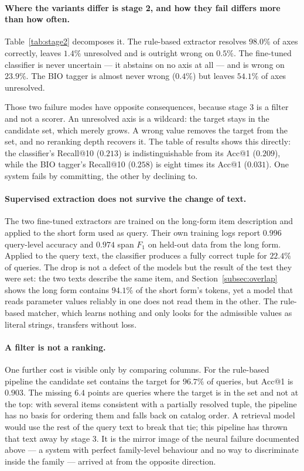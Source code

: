 \documentclass[preprint,12pt]{elsarticle}
\begin{document}
\paragraph{Where the variants differ is stage 2, and how they fail differs more than how often.}
Table~\ref{tab:stage2} decomposes it. The rule-based extractor resolves $98.0\%$ of axes correctly, leaves $1.4\%$ unresolved and is outright wrong on $0.5\%$. The fine-tuned classifier is never uncertain --- it abstains on no axis at all --- and is wrong on $23.9\%$. The BIO tagger is almost never wrong ($0.4\%$) but leaves $54.1\%$ of axes unresolved.



Those two failure modes have opposite consequences, because stage 3 is a filter and not a scorer. An unresolved axis is a wildcard: the target stays in the candidate set, which merely grows. A wrong value removes the target from the set, and no reranking depth recovers it. The table of results shows this directly: the classifier's Recall@10 ($0.213$) is indistinguishable from its Acc@1 ($0.209$), while the BIO tagger's Recall@10 ($0.258$) is eight times its Acc@1 ($0.031$). One system fails by committing, the other by declining to.

\paragraph{Supervised extraction does not survive the change of text.}
The two fine-tuned extractors are trained on the long-form item description and applied to the short form used as query. Their own training logs report $0.996$ query-level accuracy and $0.974$ span $F_1$ on held-out data from the long form. Applied to the query text, the classifier produces a fully correct tuple for $22.4\%$ of queries. The drop is not a defect of the models but the result of the test they were set: the two texts describe the same item, and Section~\ref{subsec:overlap} shows the long form contains $94.1\%$ of the short form's tokens, yet a model that reads parameter values reliably in one does not read them in the other. The rule-based matcher, which learns nothing and only looks for the admissible values as literal strings, transfers without loss.

\paragraph{A filter is not a ranking.}
One further cost is visible only by comparing columns. For the rule-based pipeline the candidate set contains the target for $96.7\%$ of queries, but Acc@1 is $0.903$. The missing $6.4$ points are queries where the target is in the set and not at the top: with several items consistent with a partially resolved tuple, the pipeline has no basis for ordering them and falls back on catalog order. A retrieval model would use the rest of the query text to break that tie; this pipeline has thrown that text away by stage 3. It is the mirror image of the neural failure documented above --- a system with perfect family-level behaviour and no way to discriminate inside the family --- arrived at from the opposite direction.
\end{document}

